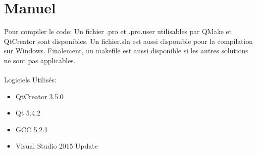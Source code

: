 \documentclass[a4paper, 12pt]{article} %
\begin{document}
\section*{Manuel}
Pour compiler le code:
Un fichier .pro et .pro.user utilisables par QMake et QtCreator sont disponibles.
Un fichier.sln est aussi disponible pour la compilation sur Windows.
Finalement, un makefile est aussi disponible si les autres solutions ne sont pas applicables.
\\
\\
Logiciels Utilisés:
\begin{itemize}
    \item QtCreator 3.5.0
    \item Qt 5.4.2
    \item GCC 5.2.1
    \item Visual Studio 2015 Update 
\end{itemize}



\end{document}
